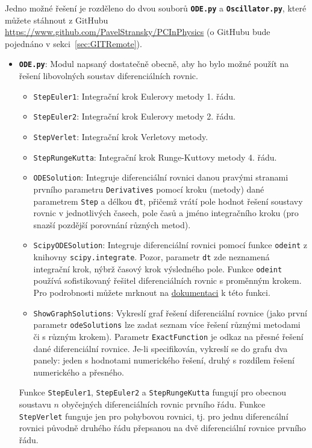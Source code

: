 \documentclass[a4paper,11pt,twoside]{article}
\def\code#1{\textnormal{\texttt{#1}}}
\def\file#1{\textnormal{\textbf{\texttt{#1}}}}
\begin{document}
    \begin{solution}
        Jedno možné řešení je rozděleno do dvou souborů \file{ODE.py} a \file{Oscillator.py}, které můžete stáhnout z GitHubu \textnormal{\url{https://www.github.com/PavelStransky/PCInPhysics}}  (o GitHubu bude pojednáno v sekci~\ref{sec:GITRemote}). 

        \begin{itemize}
        \item \file{ODE.py}: 
            Modul napsaný dostatečně obecně, aby ho bylo možné použít na řešení libovolných soustav diferenciálních rovnic.
            \begin{itemize}
            \item \code{StepEuler1}: 
                Integrační krok Eulerovy metody 1. řádu.
            \item \code{StepEuler2}: 
                Integrační krok Eulerovy metody 2. řádu.
            \item \code{StepVerlet}: 
                Integrační krok Verletovy metody.
            \item \code{StepRungeKutta}: 
                Integrační krok Runge-Kuttovy metody 4. řádu.
            \item \code{ODESolution}: 
                Integruje diferenciální rovnici danou pravými stranami prvního parametru \code{Derivatives} pomocí kroku (metody) dané parametrem \code{Step} a délkou \code{dt}, přičemž vrátí pole hodnot řešení soustavy rovnic v jednotlivých časech, pole časů a jméno integračního kroku (pro snazší pozdější porovnání různých metod).
            \item \code{ScipyODESolution}: 
                Integruje diferenciální rovnici pomocí funkce \code{odeint} z knihovny \code{scipy.integrate}. 
                Pozor, parametr \code{dt} zde neznamená integrační krok, nýbrž časový krok výsledného pole.
                Funkce \code{odeint} používá sofistikovaný řešitel diferenciálních rovnic s proměnným krokem.
                Pro podrobnosti můžete mrknout na \href{https://docs.scipy.org/doc/scipy/reference/generated/scipy.integrate.odeint.html}{dokumentaci} k této funkci.

            \item \code{ShowGraphSolutions}:
                Vykreslí graf řešení diferenciální rovnice (jako první parametr \code{odeSolutions} lze zadat seznam více řešení různými metodami či s různým krokem).
                Parametr \code{ExactFunction} je odkaz na přesné řešení dané diferenciální rovnice. 
                Je-li specifikován, vykreslí se do grafu dva panely: jeden s hodnotami numerického řešení, druhý s rozdílem řešení numerického a přesného.                 
            \end{itemize}
            Funkce \code{StepEuler1}, \code{StepEuler2} a \code{StepRungeKutta} fungují pro obecnou soustavu $n$ o\-by\-čej\-ných diferenciálních rovnic prvního řádu.
            Funkce \code{StepVerlet} funguje jen pro pohybovou rovnici, tj. pro jednu diferencální rovnici původně druhého řádu přepsanou na dvě diferenciální rovnice prvního řádu.


\end{itemize}
\end{solution}
\end{document}
